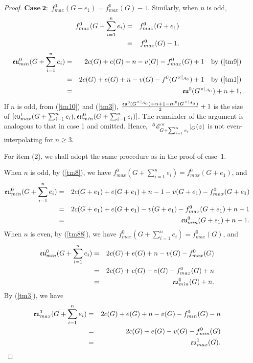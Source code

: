 \begin{proof}
$\mathbf{Case~ 2}:$  $f^{0}_{max}(G +e_{1})=f^{0}_{max}(G)-1$.  Similarly, when $n$ is odd, \begin{eqnarray}
f^{0}_{max}(G +\sum ^{n}_{i=1}e_{i})&=& f^{0}_{max}(G +e_{1})\label{tm9}\\
&=& f^{0}_{max}(G)-1.\notag \end{eqnarray}
\begin{eqnarray}
{\mathfrak{eu}}^{0}_{min}(G +\sum ^{n}_{i=1}e_{i})&=& 2c(G)+e(G )+n-v(G )- f^{0}_{max}(G)+1\quad\text{by~(\ref{tm9})}\notag\\
&=& 2c(G)+e(G )+n-v(G )- f^{0}(G^{\times|_{A_{0}}})+1\quad\text{by~(\ref{tm1})} \notag\\
&=& {\mathfrak{eu}}^{0}(G^{\times|_{A_{0}}})+n+1,\label{tm10}
 \end{eqnarray}
  {If $n$ is odd,  from (\ref{tm10}) and (\ref{tm3}),
 $\frac{{\mathfrak{eu}}^{0}(G^{\times|_{A_{0}}})+n+1-{\mathfrak{eu}}^{0}(G^{\times|_{A_{0}}})}{2}+1$ is the size of  $[{\mathfrak{eu}}^{1}_{max}(G +\sum ^{n}_{i=1}e_{i}),
    {\mathfrak{eu}}^{0}_{min}(G +\sum ^{n}_{i=1}e_{i})]$.
 The remainder of the argument is analogous to that in case 1 and omitted. Hence, $~^{\partial}{{\mathscr{E}}}^{\times}_{G+\sum ^{n}_{i=1}e_{i}}|_O(z)$ is not  even-interpolating  for $n\geq3$.}

For item (2),  we shall adopt the same procedure as in the proof of  case~1.

\noindent When $n$ is odd,
  by (\ref{tm8}),    we have $f^{0}_{max}(G +\sum ^{n}_{i=1}e_{i})= f^{0}_{max}(G+e_{1} )$, and \begin{eqnarray}\label{1121}
{\mathfrak{eu}}^{0}_{min}(G +\sum ^{n}_{i=1}e_{i})&=& 2c(G+e_{1} )+e(G+e_{1} )+n-1-v(G+e_{1} )- f^{0}_{max}(G+e_{1} )\notag\\
&=& 2c(G+e_{1} )+e(G+e_{1} )-v(G+e_{1} )- f^{0}_{max}(G+e_{1} )+n-1\notag\\
&=& {\mathfrak{eu}}^{0}_{min}(G +e_{1})+n-1.
 \end{eqnarray}
\noindent When $n$ is even, by (\ref{tm88}),    we have $f^{0}_{max}(G +\sum ^{n}_{i=1}e_{i})
= f_{max}^{0}(G)$, and
\begin{eqnarray}\label{1122}
{\mathfrak{eu}}^{0}_{min}(G +\sum ^{n}_{i=1}e_{i})&=& 2c(G)+e(G)+n-v(G)- f^{0}_{max}(G)\notag\\
&=& 2c(G)+e(G)-v(G)- f^{0}_{max}(G)+n\notag\\
&=& {\mathfrak{eu}}^{0}_{min}(G)+n.
 \end{eqnarray}
By (\ref{tm3}), we have
\begin{eqnarray}\label{1123}
{\mathfrak{eu}}^{1}_{max}(G +\sum ^{n}_{i=1}e_{i})&=& 2c(G)+e(G)+n-v(G)- f^{0}_{min}(G)-n\notag\\
&=& 2c(G)+e(G)-v(G)- f^{0}_{min}(G)\notag\\
&=& {\mathfrak{eu}}^{1}_{max}(G).
 \end{eqnarray}


\end{proof}
